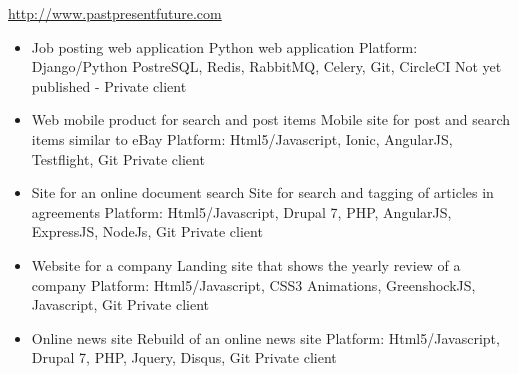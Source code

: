 \documentclass[11pt,a4paper]{moderncv}
\begin{document}
{
    \url{http://www.pastpresentfuture.com}
    \begin{itemize}
        \item Job posting web application
            \newline{}
            Python web application
            \newline{}
            Platform: Django/Python PostreSQL, Redis, RabbitMQ, Celery, Git, CircleCI
            \newline{}
            Not yet published - Private client
            \newline{}
        \item Web mobile product for search and post items
            \newline{}
            Mobile site for post and search items similar to eBay
            \newline{}
            Platform: Html5/Javascript, Ionic, AngularJS, Testflight, Git
            \newline{}
            Private client
            \newline{}
        \item Site for an online document search
            \newline{}
            Site for search and tagging of articles in agreements 
            \newline{}
            Platform: Html5/Javascript, Drupal 7, PHP, AngularJS, ExpressJS, NodeJs, Git
            \newline{}
            Private client
            \newline{}
        \item Website for a company
            \newline{}
            Landing site that shows the yearly review of a company 
            \newline{}
            Platform: Html5/Javascript, CSS3 Animations, GreenshockJS, Javascript, Git
            \newline{}
            Private client
            \newline{}
        \item Online news site
            \newline{}
            Rebuild of an online news site  
            \newline{}
            Platform: Html5/Javascript, Drupal 7, PHP, Jquery, Disqus, Git
            \newline{}
            Private client
            \newline{}
    \end{itemize}
}
\end{document}
